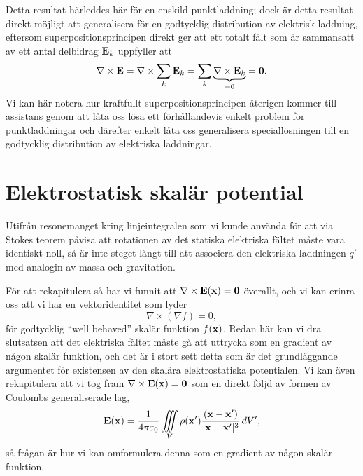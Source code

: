 Detta resultat h{\"a}rleddes h{\"a}r f{\"o}r en enskild punktladdning; dock {\"a}r detta resultat direkt m{\"o}jligt att generalisera f{\"o}r en godtycklig distribution av elektrisk laddning, eftersom superpositionsprincipen direkt ger att ett totalt f{\"a}lt som {\"a}r sammansatt av ett antal delbidrag ${\bf E}_k$ uppfyller att
$$
  \nabla\times{\bf E}
    =\nabla\times\sum_k{\bf E}_k
    =\sum_k\underbrace{\nabla\times{\bf E}_k}_{=0}
    ={\bf 0}.
$$
Vi kan h{\"a}r notera hur kraftfullt superpositionsprincipen {\aa}terigen kommer till assistans genom att l{\aa}ta oss l{\"o}sa ett f{\"o}rh{\aa}llandevis enkelt problem f{\"o}r punktladdningar och d{\"a}refter enkelt l{\aa}ta oss generalisera speciall{\"o}sningen till en godtycklig distribution av elektriska laddningar.

\section{Elektrostatisk skal{\"a}r potential}
Utifr{\aa}n resonemanget kring linjeintegralen som vi kunde anv{\"a}nda f{\"o}r att via Stokes teorem p{\aa}visa att rotationen av det statiska elektriska f{\"a}ltet m{\aa}ste vara identiskt noll, s{\aa} {\"a}r inte steget l{\aa}ngt till att associera den elektriska laddningen $q'$ med analogin av massa och gravitation.

F{\"o}r att rekapitulera s{\aa} har vi funnit att $\nabla\times{\bf E}({\bf x})={\bf 0}$ {\"o}verallt, och vi kan erinra oss att vi har en vektoridentitet som lyder
$$
  \nabla\times(\nabla f)=0,
$$
f{\"o}r godtycklig ``well behaved'' skal{\"a}r funktion $f({\bf x})$. Redan h{\"a}r kan vi dra slutsatsen att det elektriska f{\"a}ltet m{\aa}ste g{\aa} att uttrycka som en gradient av n{\aa}gon skal{\"a}r funktion, och det {\"a}r i stort sett detta som {\"a}r det grundl{\"a}ggande argumentet f{\"o}r existensen av den skal{\"a}ra elektrostatiska potentialen.
Vi kan {\"a}ven rekapitulera att vi tog fram $\nabla\times{\bf E}({\bf x})={\bf 0}$ som en direkt f{\"o}ljd av formen av Coulombs generaliserade lag,
$$
  {\bf E}({\bf x})={{1}\over{4\pi\varepsilon_0}}\iiint_V\rho({\bf x}')
    {{({\bf x}-{\bf x}')}\over{|{\bf x}-{\bf x}'|^3}}\,dV',
$$
s{\aa} fr{\aa}gan {\"a}r hur vi kan omformulera denna som en gradient av n{\aa}gon skal{\"a}r funktion.

